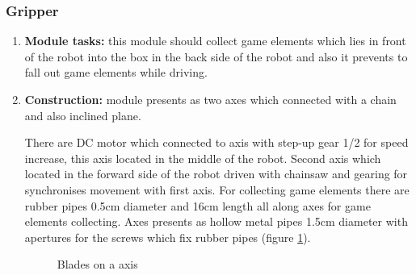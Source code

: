 \subsubsection{Gripper}

\begin{enumerate}
  \item 
	\textbf{Module tasks:}
	  this module should collect game elements which lies in front of the robot into the box in the back side of the robot and also it prevents to fall out game elements while driving.
  \item 
	\textbf{Construction:} 
	  module presents as two axes which connected with a chain and also inclined plane. %
	  
	  There are DC motor which connected to axis with step-up gear 1/2 for speed increase, this axis located in the middle of the robot. Second axis which located in the forward side 
	  of the robot driven with chainsaw and gearing for synchronises movement with first axis. For collecting game elements there are rubber pipes 0.5cm diameter and 16cm length all 
	  along axes for game elements collecting. Axes presents as hollow metal pipes 1.5cm diameter with apertures for the screws which fix rubber pipes (figure \ref{Gripper600}).
      \begin{figure}[H]
      	\begin{minipage}[h]{1\linewidth}
      		\caption{Blades on a axis}
      		\label{Gripper600}
      	\end{minipage}
      \end{figure}
      

\end{enumerate}
